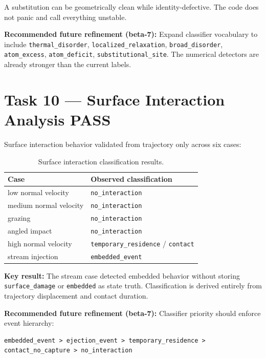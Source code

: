 \documentclass[11pt,a4paper]{article}
\newcommand{\statpass}{\textbf{\textcolor{passgreen}{PASS}}}
\begin{document}
A substitution can be geometrically clean while identity-defective. The code does not panic and
call everything unstable.

\textbf{Recommended future refinement (beta-7):} Expand classifier vocabulary to include
\texttt{thermal\_disorder}, \texttt{localized\_relaxation}, \texttt{broad\_disorder},
\texttt{atom\_excess}, \texttt{atom\_deficit}, \texttt{substitutional\_site}. The numerical
detectors are already stronger than the current labels.

\section{Task 10 --- Surface Interaction Analysis \hfill\statpass}

Surface interaction behavior validated from trajectory only across six cases:

\begin{table}[h!]
\centering
\begin{tabularx}{\linewidth}{lX}
\toprule
\textbf{Case} & \textbf{Observed classification} \\
\midrule
low normal velocity    & \texttt{no\_interaction} \\
medium normal velocity & \texttt{no\_interaction} \\
grazing                & \texttt{no\_interaction} \\
angled impact          & \texttt{no\_interaction} \\
high normal velocity   & \texttt{temporary\_residence} / \texttt{contact} \\
stream injection       & \texttt{embedded\_event} \\
\bottomrule
\end{tabularx}
\caption{Surface interaction classification results.}
\end{table}

\textbf{Key result:} The stream case detected embedded behavior without storing
\texttt{surface\_damage} or \texttt{embedded} as state truth. Classification is derived entirely
from trajectory displacement and contact duration.

\textbf{Recommended future refinement (beta-7):} Classifier priority should enforce event
hierarchy:
\begin{lstlisting}
embedded_event > ejection_event > temporary_residence > contact_no_capture > no_interaction
\end{lstlisting}
\end{document}
